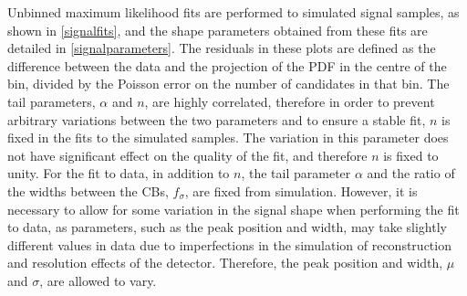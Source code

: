 Unbinned maximum likelihood fits are performed to simulated signal samples, as shown in \fig\ref{signalfits}, and the shape parameters obtained from these fits are detailed in \tab\ref{signalparameters}. The residuals in these plots are defined as the difference between the data and the projection of the PDF in the centre of the bin, divided by the Poisson error on the number of candidates in that bin. The tail parameters, $\alpha$ and $n$, are highly correlated, therefore in order to prevent arbitrary variations between the two parameters and to ensure a stable fit, $n$ is fixed in the fits to the simulated samples. The variation in this parameter does not have significant effect on the quality of the fit, and therefore $n$ is fixed to unity. For the fit to data, in addition to $n$, the tail parameter $\alpha$ and the ratio of the widths between the CBs, $f_{\sigma}$, are fixed from simulation. However, it is necessary to allow for some variation in the signal shape when performing the fit to data, as parameters, such as the peak position and width, may take slightly different values in data due to imperfections in the simulation of reconstruction and resolution effects of the \lhcb detector. Therefore, the peak position and width, $\mu$ and $\sigma$, are allowed to vary.

